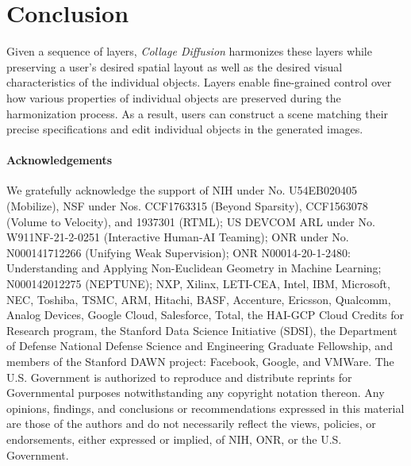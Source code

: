 \vspace{-1em}
\section{Conclusion}
\vspace{-0.5em}

Given a sequence of layers, \textit{Collage Diffusion} harmonizes these layers while preserving a user's desired spatial layout as well as the desired visual characteristics of the individual objects. 
Layers enable fine-grained control over how various properties of individual objects are preserved during the harmonization process. 
As a result, users can construct a scene matching their precise specifications and edit individual objects in the generated images. 

\paragraph{Acknowledgements} 
We gratefully acknowledge the support of NIH under No. U54EB020405 (Mobilize), NSF under Nos. CCF1763315 (Beyond Sparsity), CCF1563078 (Volume to Velocity), and 1937301 (RTML); US DEVCOM ARL under No. W911NF-21-2-0251 (Interactive Human-AI Teaming); ONR under No. N000141712266 (Unifying Weak Supervision); ONR N00014-20-1-2480: Understanding and Applying Non-Euclidean Geometry in Machine Learning; N000142012275 (NEPTUNE); NXP, Xilinx, LETI-CEA, Intel, IBM, Microsoft, NEC, Toshiba, TSMC, ARM, Hitachi, BASF, Accenture, Ericsson, Qualcomm, Analog Devices, Google Cloud, Salesforce, Total, the HAI-GCP Cloud Credits for Research program, the Stanford Data Science Initiative (SDSI), the Department of Defense National Defense Science and Engineering Graduate Fellowship, and members of the Stanford DAWN project: Facebook, Google, and VMWare. The U.S. Government is authorized to reproduce and distribute reprints for Governmental purposes notwithstanding any copyright notation thereon. Any opinions, findings, and conclusions or recommendations expressed in this material are those of the authors and do not necessarily reflect the views, policies, or endorsements, either expressed or implied, of NIH, ONR, or the U.S. Government.